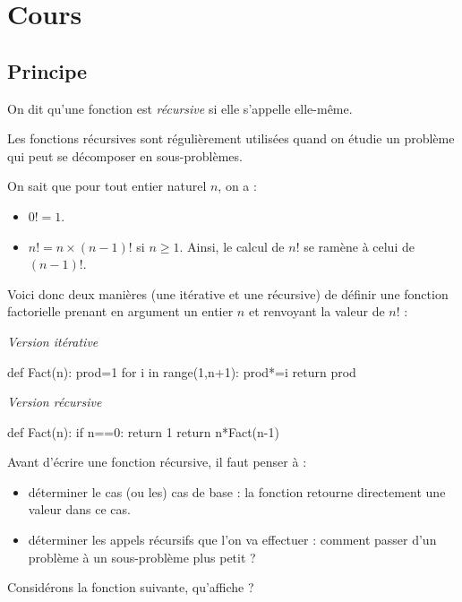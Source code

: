 \documentclass[french,11pt,twoside]{VcCours}
\begin{document}

\tableofcontents
\separationTitre


\section{Cours}

\subsection{Principe}

\begin{Definition}{}
    On dit qu'une fonction est \emph{récursive} si elle s'appelle elle-même.
\end{Definition}

Les fonctions récursives sont régulièrement utilisées quand on étudie un problème qui peut se décomposer en sous-problèmes.

\begin{Exercice}{} On sait que pour tout entier naturel $n$, on a :
\begin{itemize}
\item $0!=1$.
\item $n!=n \times (n-1)!$ si $n \geq 1$. Ainsi, le calcul de $n!$ se ramène à celui de $(n-1)!$.
\end{itemize}
Voici donc deux manières (une itérative et une récursive) de définir une fonction factorielle prenant en argument un entier $n$ et renvoyant la valeur de $n!$ :
\end{Exercice}

\vspace{-2em}
\begin{multicols}{2}
\begin{center}
    \emph{Version itérative}
\end{center}
\begin{Python}
def Fact(n):
    prod=1
    for i in range(1,n+1):
        prod*=i
    return prod
\end{Python} 
\columnbreak
\begin{center}
    \emph{Version récursive}
\end{center}
\begin{Python}
def Fact(n):
    if n==0:
        return 1
    return n*Fact(n-1)
\end{Python} 
\end{multicols}

\newpage
Avant d'écrire une fonction récursive, il faut penser à :
\begin{itemize}
\item déterminer le cas (ou les) cas de base : la fonction retourne directement une valeur dans ce cas.
\item déterminer les appels récursifs que l'on va effectuer : comment passer d'un problème à un sous-problème plus petit ?
\end{itemize}
\begin{Exercice}{} 
    Considérons la fonction suivante, qu'affiche  ?
\end{Exercice}
\end{document}
